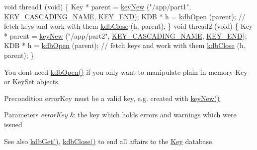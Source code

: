 \begin{DoxyCodeInclude}
\textcolor{keywordtype}{void} thread1 (\textcolor{keywordtype}{void})
\{
        Key * parent = \hyperlink{group__key_gad23c65b44bf48d773759e1f9a4d43b89}{keyNew} (\textcolor{stringliteral}{"/app/part1"}, \hyperlink{group__key_gga9b703ca49f48b482def322b77d3e6bc8afc1567f74444ff9c219f7456b652b4ec}{KEY\_CASCADING\_NAME}, 
      \hyperlink{group__key_gga9b703ca49f48b482def322b77d3e6bc8aa8adb6fcb92dec58fb19410eacfdd403}{KEY\_END});
        KDB * h = \hyperlink{group__kdb_ga6808defe5870f328dd17910aacbdc6ca}{kdbOpen} (parent);
        \textcolor{comment}{// fetch keys and work with them}
        \hyperlink{group__kdb_gadb54dc9fda17ee07deb9444df745c96f}{kdbClose} (h, parent);
\}
\textcolor{keywordtype}{void} thread2 (\textcolor{keywordtype}{void})
\{
        Key * parent = \hyperlink{group__key_gad23c65b44bf48d773759e1f9a4d43b89}{keyNew} (\textcolor{stringliteral}{"/app/part2"}, \hyperlink{group__key_gga9b703ca49f48b482def322b77d3e6bc8afc1567f74444ff9c219f7456b652b4ec}{KEY\_CASCADING\_NAME}, 
      \hyperlink{group__key_gga9b703ca49f48b482def322b77d3e6bc8aa8adb6fcb92dec58fb19410eacfdd403}{KEY\_END});
        KDB * h = \hyperlink{group__kdb_ga6808defe5870f328dd17910aacbdc6ca}{kdbOpen} (parent);
        \textcolor{comment}{// fetch keys and work with them}
        \hyperlink{group__kdb_gadb54dc9fda17ee07deb9444df745c96f}{kdbClose} (h, parent);
\}
\end{DoxyCodeInclude}
 You don\textquotesingle{}t need \hyperlink{group__kdb_ga6808defe5870f328dd17910aacbdc6ca}{kdb\+Open()} if you only want to manipulate plain in-\/memory Key or Key\+Set objects.

\begin{DoxyPrecond}{Precondition}
error\+Key must be a valid key, e.\+g. created with \hyperlink{group__key_gad23c65b44bf48d773759e1f9a4d43b89}{key\+New()}
\end{DoxyPrecond}

\begin{DoxyParams}{Parameters}
{\em error\+Key} & the key which holds errors and warnings which were issued \\
\hline
\end{DoxyParams}
\begin{DoxySeeAlso}{See also}
\hyperlink{group__kdb_ga28e385fd9cb7ccfe0b2f1ed2f62453a1}{kdb\+Get()}, \hyperlink{group__kdb_gadb54dc9fda17ee07deb9444df745c96f}{kdb\+Close()} to end all affairs to the \hyperlink{group__key}{Key} database. 
\end{DoxySeeAlso}

